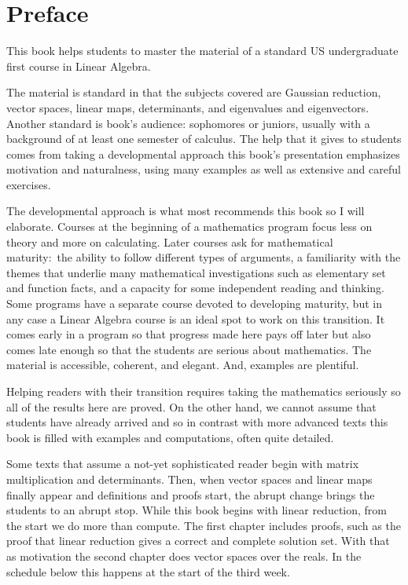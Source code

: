 {\setlength{\parskip}{.7ex}  %
\chapter*{Preface}
This book helps students to master the material of a standard 
US undergraduate first course in Linear Algebra.

The material is standard in that the subjects covered are
Gaussian reduction, 
vector spaces, linear maps,
determinants, and eigenvalues and eigenvectors.
Another standard is book's audience:
sophomores or juniors, usually with a background 
of at least one semester of calculus. 
The help that it gives to students comes from taking a developmental 
approach\Dash 
this book's presentation emphasizes motivation and naturalness, 
using many examples as well as extensive and careful exercises.

The developmental approach is what most recommends this book
so I will elaborate.
Courses at the beginning of a mathematics program
focus less on theory and more on calculating.
Later courses
ask for mathematical maturity:~the ability to follow different 
types of arguments, 
a familiarity with
the themes that underlie many mathematical investigations such as
elementary set and function facts,
and a capacity for some independent reading and thinking.
Some programs have a separate course devoted to developing maturity, but
in any case a Linear Algebra course 
is an ideal spot to work on this transition.
It comes early in a program so that progress made here pays off later
but also comes late enough so that the 
students are serious about mathematics.
The material is accessible, coherent, and elegant.
And, examples are plentiful.

Helping readers with their transition 
requires taking the mathematics seriously so
all of the results here are proved.
On the other hand, we cannot
assume that students have already arrived
and so 
in contrast with more advanced texts 
this book is filled with examples and computations,
often quite detailed.

Some texts that assume a not-yet sophisticated reader
begin with
matrix multiplication
and determinants.
Then, when 
vector spaces and linear maps finally appear
and definitions and proofs start, the abrupt change
brings the students to an abrupt stop.
While this book begins with
linear reduction, from the start
we do more than compute.
The first chapter
includes proofs, such as the proof that linear reduction gives a correct and
complete solution set.
With that as motivation
the second chapter does vector spaces over the reals.
In the schedule below this happens at the start of the third week.

}
